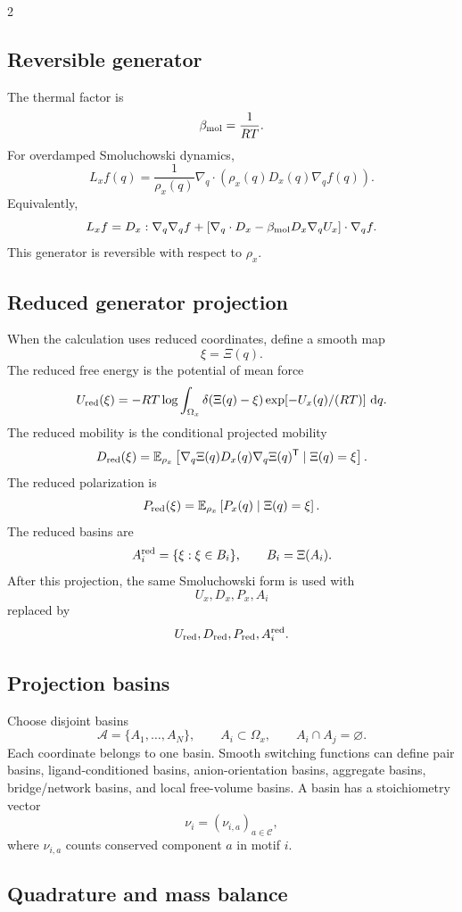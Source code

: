 \documentclass[10pt]{article}
\newcommand{\dd}{\,\mathrm d}
\newcommand{\T}{\mathsf{T}}
\begin{document}
\begin{multicols}{2}
\subsection{Reversible generator}
\label{sec:generator}

The thermal factor is
\[
\beta_{\rm mol}=\frac{1}{RT}.
\]
For overdamped Smoluchowski dynamics,
\[
L_x f(q)
=
\frac{1}{\rho_x(q)}
\nabla_q\cdot
\left(\rho_x(q)D_x(q)\nabla_q f(q)\right).
\]
Equivalently,
\[
L_x f
=
D_x:\nabla_q\nabla_q f
+
\left[
\nabla_q\cdot D_x
-
\beta_{\rm mol}D_x\nabla_qU_x
\right]\cdot\nabla_qf.
\]
This generator is reversible with respect to \(\rho_x\).

\subsection{Reduced generator projection}

When the calculation uses reduced coordinates, define a smooth map
\[
\xi=\Xi(q).
\]
The reduced free energy is the potential of mean force
\[
U_{\rm red}(\xi)
=
-RT
\log
\int_{\Omega_x}
\delta(\Xi(q)-\xi)
\exp[-U_x(q)/(RT)]\,\dd q.
\]
The reduced mobility is the conditional projected mobility
\[
D_{\rm red}(\xi)
=
\mathbb E_{\rho_x}
\left[
\nabla_q\Xi(q)D_x(q)\nabla_q\Xi(q)^\T
\mid
\Xi(q)=\xi
\right].
\]
The reduced polarization is
\[
P_{\rm red}(\xi)
=
\mathbb E_{\rho_x}
\left[
P_x(q)
\mid
\Xi(q)=\xi
\right].
\]
The reduced basins are
\[
A_i^{\rm red}
=
\{\xi:\xi\in B_i\},
\qquad
B_i=\Xi(A_i).
\]
After this projection, the same Smoluchowski form is used with
\[
U_x,D_x,P_x,A_i
\]
replaced by
\[
U_{\rm red},D_{\rm red},P_{\rm red},A_i^{\rm red}.
\]

\subsection{Projection basins}
\label{sec:basins}

Choose disjoint basins
\[
\mathcal A=\{A_1,\ldots,A_N\},
\qquad
A_i\subset\Omega_x,
\qquad
A_i\cap A_j=\varnothing.
\]
Each coordinate belongs to one basin. Smooth switching functions can define pair
basins, ligand-conditioned basins, anion-orientation basins, aggregate basins,
bridge/network basins, and local free-volume basins. A basin has a
stoichiometry vector
\[
\nu_i=(\nu_{i,a})_{a\in\mathcal C},
\]
where \(\nu_{i,a}\) counts conserved component \(a\) in motif \(i\).

\subsection{Quadrature and mass balance}
\label{sec:massbalance}


\end{multicols}
\end{document}
